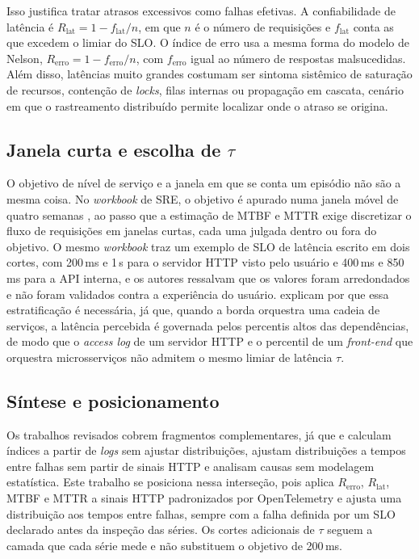 \documentclass[12pt, a4paper, oneside]{article}
\begin{document}
Isso justifica tratar atrasos excessivos como falhas efetivas. A confiabilidade de latência é $R_{\mathrm{lat}} = 1 - f_{\mathrm{lat}}/n$, em que $n$ é o número de requisições e $f_{\mathrm{lat}}$ conta as que excedem o limiar do SLO. O índice de erro usa a mesma forma do modelo de Nelson, $R_{\mathrm{erro}} = 1 - f_{\mathrm{erro}}/n$, com $f_{\mathrm{erro}}$ igual ao número de respostas malsucedidas. Além disso, latências muito grandes costumam ser sintoma sistêmico de saturação de recursos, contenção de \textit{locks}, filas internas ou propagação em cascata, cenário em que o rastreamento distribuído \cite{Sigelman2010} permite localizar onde o atraso se origina.

\subsection{Janela curta e escolha de $\tau$}

O objetivo de nível de serviço e a janela em que se conta um episódio não são a mesma coisa. No \textit{workbook} de SRE, o objetivo é apurado numa janela móvel de quatro semanas \cite{beyer2018workbook}, ao passo que a estimação de MTBF e MTTR exige discretizar o fluxo de requisições em janelas curtas, cada uma julgada dentro ou fora do objetivo. O mesmo \textit{workbook} traz um exemplo de SLO de latência escrito em dois cortes, com 200\,ms e 1\,s para o servidor HTTP visto pelo usuário e 400\,ms e 850\,ms para a API interna, e os autores ressalvam que os valores foram arredondados e não foram validados contra a experiência do usuário.  explicam por que essa estratificação é necessária, já que, quando a borda orquestra uma cadeia de serviços, a latência percebida é governada pelos percentis altos das dependências, de modo que o \textit{access log} de um servidor HTTP e o percentil de um \textit{front-end} que orquestra microsserviços não admitem o mesmo limiar de latência $\tau$.

\subsection{Síntese e posicionamento}

Os trabalhos revisados cobrem fragmentos complementares, já que  e  calculam índices a partir de \textit{logs} sem ajustar distribuições,  ajustam distribuições a tempos entre falhas sem partir de sinais HTTP e  analisam causas sem modelagem estatística. Este trabalho se posiciona nessa interseção, pois aplica $R_{\mathrm{erro}}$, $R_{\mathrm{lat}}$, MTBF e MTTR a sinais HTTP padronizados por OpenTelemetry e ajusta uma distribuição aos tempos entre falhas, sempre com a falha definida por um SLO declarado antes da inspeção das séries. Os cortes adicionais de $\tau$ seguem a camada que cada série mede e não substituem o objetivo de 200\,ms.
\end{document}
